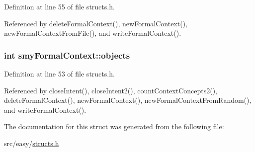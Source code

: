 \-Definition at line 55 of file structs.\-h.



\-Referenced by delete\-Formal\-Context(), new\-Formal\-Context(), new\-Formal\-Context\-From\-File(), and write\-Formal\-Context().

\hypertarget{structsmyFormalContext_ab6e220297887bc2af0e612c94132ceb3}{
\subsubsection[{objects}]{\setlength{\rightskip}{0pt plus 5cm}int {\bf smy\-Formal\-Context\-::objects}}}\label{structsmyFormalContext_ab6e220297887bc2af0e612c94132ceb3}


\-Definition at line 53 of file structs.\-h.



\-Referenced by close\-Intent(), close\-Intent2(), count\-Context\-Concepts2(), delete\-Formal\-Context(), new\-Formal\-Context(), new\-Formal\-Context\-From\-Random(), and write\-Formal\-Context().



\-The documentation for this struct was generated from the following file\-:\begin{DoxyCompactItemize}
\item 
src/easy/\hyperlink{easy_2structs_8h}{structs.\-h}\end{DoxyCompactItemize}
